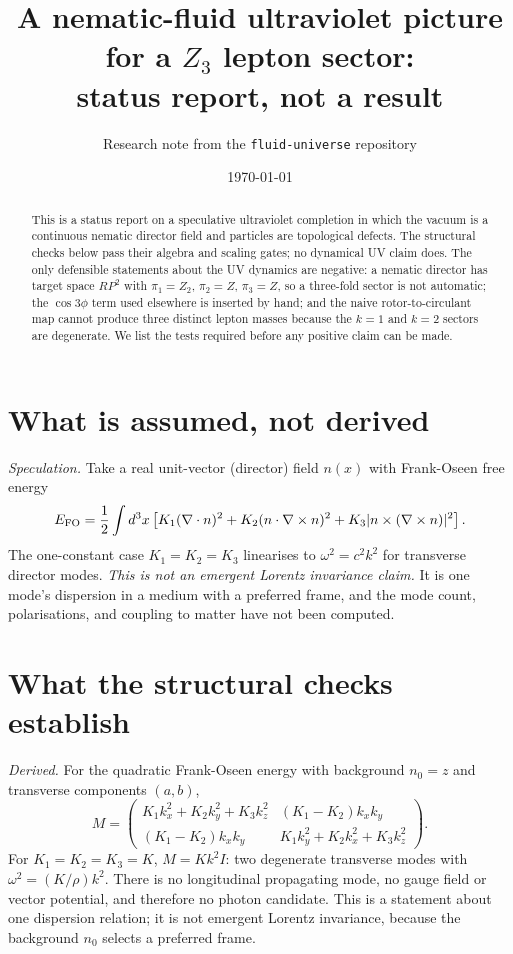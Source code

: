\documentclass[11pt]{article}
\title{A nematic-fluid ultraviolet picture for a $Z_3$ lepton sector:\\
status report, not a result}
\author{Research note from the \texttt{fluid-universe} repository}
\date{\today}
\begin{document}
\maketitle

\begin{abstract}
This is a status report on a speculative ultraviolet completion in which the
vacuum is a continuous nematic director field and particles are topological
defects. The structural checks below pass their algebra and scaling gates; no dynamical UV claim does.
The only defensible statements about the UV dynamics are negative: a nematic director has target
space $RP^2$ with $\pi_1=Z_2$, $\pi_2=Z$, $\pi_3=Z$, so a three-fold sector is
not automatic; the $\cos3\phi$ term used elsewhere is inserted by hand; and the
naive rotor-to-circulant map cannot produce three distinct lepton masses
because the $k=1$ and $k=2$ sectors are degenerate. We list the tests required
before any positive claim can be made.
\end{abstract}

\section{What is assumed, not derived}
\label{sec:assumed}

\emph{Speculation.} Take a real unit-vector (director) field $n(x)$ with
Frank-Oseen free energy
\begin{equation}
E_{\rm FO}=\frac12\int d^3x\left[
K_1(\nabla\cdot n)^2+K_2(n\cdot\nabla\times n)^2
+K_3|n\times(\nabla\times n)|^2\right].
\label{eq:fo}
\end{equation}
The one-constant case $K_1=K_2=K_3$ linearises to $\omega^2=c^2k^2$ for
transverse director modes. \emph{This is not an emergent Lorentz invariance
claim.} It is one mode's dispersion in a medium with a preferred frame, and the
mode count, polarisations, and coupling to matter have not been computed.

\section{What the structural checks establish}
\label{sec:structural}

\emph{Derived.} For the quadratic Frank-Oseen energy with background
$n_0=z$ and transverse components $(a,b)$,
\begin{equation}
M=\begin{pmatrix}
K_1k_x^2+K_2k_y^2+K_3k_z^2 & (K_1-K_2)k_xk_y\\
(K_1-K_2)k_xk_y & K_1k_y^2+K_2k_x^2+K_3k_z^2
\end{pmatrix}.
\end{equation}
For $K_1=K_2=K_3=K$, $M=Kk^2 I$: two degenerate transverse modes with
$\omega^2=(K/\rho)k^2$. There is no longitudinal propagating mode, no gauge
field or vector potential, and therefore no photon candidate. This is a
statement about one dispersion relation; it is not emergent Lorentz
invariance, because the background $n_0$ selects a preferred frame.
\end{document}
